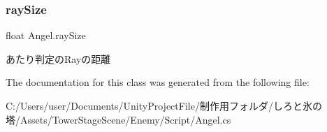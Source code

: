 \mbox{\label{class_angel_acd83f4f3c29ee3349e5ed2eeaf30c764}} 
\subsubsection{\texorpdfstring{ray\+Size}{raySize}}
{\footnotesize\ttfamily float Angel.\+ray\+Size\hspace{0.3cm}{\ttfamily [private]}}



あたり判定の\+Rayの距離 



The documentation for this class was generated from the following file\+:\begin{DoxyCompactItemize}
\item 
C\+:/\+Users/user/\+Documents/\+Unity\+Project\+File/制作用フォルダ/しろと氷の塔/\+Assets/\+Tower\+Stage\+Scene/\+Enemy/\+Script/Angel.\+cs\end{DoxyCompactItemize}
